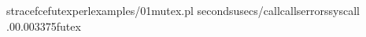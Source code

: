 \PGZdl{}strace\PGZhy{}f\PGZhy{}c\PGZhy{}efutexperlexamples/01\PGZhy{}mutex.pl
\PGZpc{}secondsusecs/callcallserrorssyscall
\PGZhy{}\PGZhy{}\PGZhy{}\PGZhy{}\PGZhy{}\PGZhy{}\PGZhy{}\PGZhy{}\PGZhy{}\PGZhy{}\PGZhy{}\PGZhy{}\PGZhy{}\PGZhy{}\PGZhy{}\PGZhy{}\PGZhy{}\PGZhy{}\PGZhy{}\PGZhy{}\PGZhy{}\PGZhy{}\PGZhy{}\PGZhy{}\PGZhy{}\PGZhy{}\PGZhy{}\PGZhy{}\PGZhy{}\PGZhy{}\PGZhy{}\PGZhy{}\PGZhy{}\PGZhy{}\PGZhy{}\PGZhy{}\PGZhy{}\PGZhy{}\PGZhy{}\PGZhy{}\PGZhy{}\PGZhy{}\PGZhy{}\PGZhy{}\PGZhy{}\PGZhy{}\PGZhy{}\PGZhy{}\PGZhy{}\PGZhy{}\PGZhy{}\PGZhy{}\PGZhy{}\PGZhy{}\PGZhy{}\PGZhy{}\PGZhy{}\PGZhy{}\PGZhy{}\PGZhy{}\PGZhy{}\PGZhy{}
.00.003375futex
